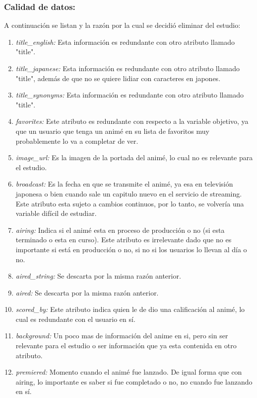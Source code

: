 \documentclass[a4paper]{article}
\begin{document}
\subsubsection{Calidad de datos:}
A continuación se listan y la razón por la cual se decidió eliminar del estudio:
\begin{enumerate}
    \item \textit{title\_english:} Esta información es redundante con otro atributo llamado "title".
    \item \textit{title\_japanese:} Esta información es redundante con otro atributo llamado "title", además de que no se quiere lidiar con caracteres en japones.
    \item \textit{title\_synonyms:} Esta información es redundante con otro atributo llamado "title".
    \item \textit{favorites:} Este atributo es redundante con respecto a la variable objetivo, ya que un usuario que tenga un animé en su lista de favoritos muy probablemente lo va a completar de ver.
    \item \textit{image\_url:} Es la imagen de la portada del animé, lo cual no es relevante para el estudio.
    \item \textit{broadcast:} Es la fecha en que se transmite el animé, ya esa en televisión japonesa o bien cuando sale un capitulo nuevo en el servicio de streaming. Este atributo esta sujeto a cambios continuos, por lo tanto, se volvería una variable difícil de estudiar.
    \item \textit{airing:} Indica si el animé esta en proceso de producción o no (si esta terminado o esta en curso). Este atributo es irrelevante dado que no es importante si está en producción o no, si no si los usuarios lo llevan al día o no.
    \item \textit{aired\_string:} Se descarta por la misma razón anterior.
    \item \textit{aired:} Se descarta por la misma razón anterior.
    \item \textit{scored\_by:} Este atributo indica quien le de dio una calificación al animé, lo cual es redundante con el usuario en sí.
    \item \textit{background:} Un poco mas de información del anime en si, pero sin ser relevante para el estudio o ser información que ya esta contenida en otro atributo.
    \item \textit{premiered:} Momento cuando el animé fue lanzado. De igual forma que con airing, lo importante es saber si fue completado o no, no cuando fue lanzando en sí.

\end{enumerate}
\end{document}
